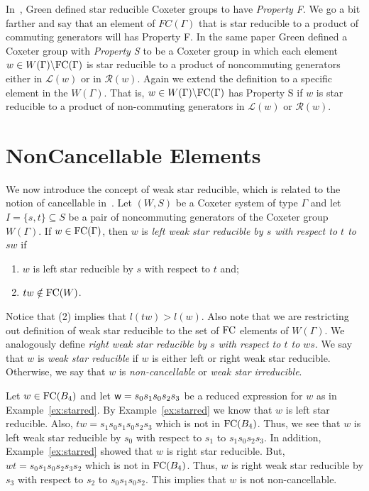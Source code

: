 In~\cite{Green2007}, Green defined star reducible Coxeter groups to have \emph{Property F}. We go a bit farther and say that an element of $FC(\Gamma)$ that is star reducible to a product of commuting generators will has Property F. In the same paper Green defined a Coxeter group with \emph{Property S} to be a Coxeter group in which each element $w \in W(\Gamma)\backslash \mathrm{FC}(\Gamma)$ is star reducible to a product of noncommuting generators either in $\mathcal{L}(w)$ or in $\mathcal{R}(w)$. Again we extend the definition to a specific element in the $W(\Gamma)$. That is, $w \in W(\Gamma)\backslash \mathrm{FC}(\Gamma)$ has Property S if $w$ is star reducible to a product of non-commuting generators in $\mathcal{L}(w)$ or $\mathcal{R}(w)$.

\section{NonCancellable Elements}
 
We now introduce the concept of weak star reducible, which is related to the notion of cancellable in~\cite{Fan1997}. Let $(W,S)$ be a Coxeter system of type $\Gamma$ and let $I=\{s,t\} \subseteq S$ be a pair of noncommuting generators of the Coxeter group $W(\Gamma)$. If $w  \in \mathrm{FC}(\Gamma)$, then $w$ is \emph{left weak star reducible by $s$ with respect to $t$ to $sw$} if
\begin{enumerate}
\item $w$ is left star reducible by $s$ with respect to $t$ and;
\item $tw \notin \mathrm{FC}(W)$.	
\end{enumerate}
Notice that (2) implies that $l(tw)>l(w)$. Also note that we are restricting out definition of weak star reducible to the set of $\mathrm{FC}$ elements of $W(\Gamma)$. We analogously define \emph{right weak star reducible by $s$ with respect to $t$ to $ws$}. We say that $w$ is \emph{weak star reducible} if $w$ is either left or right weak star reducible. Otherwise, we say that $w$ is \emph{non-cancellable} or \emph{weak star irreducible}.

\begin{example}\label{ex:noncancel}
Let $w \in \mathrm{FC}(B_4)$ and let $\mathsf{w}=s_0s_1s_0s_2s_3$ be a reduced expression for $w$ as in Example~\ref{ex:starred}. By Example~\ref{ex:starred} we know that $w$ is left star reducible. Also, $tw=s_1s_0s_1s_0s_2s_3$ which is not in $\mathrm{FC}(B_4)$. Thus, we see that $w$ is left weak star reducible by $s_0$ with respect to $s_1$ to $s_1s_0s_2s_3$. In addition, Example~\ref{ex:starred} showed that $w$ is right star reducible. But, $wt=s_0s_1s_0s_2s_3s_2$ which is not in $\mathrm{FC}(B_4)$. Thus, $w$ is right weak star reducible by $s_3$ with respect to $s_2$ to $s_0s_1s_0s_2$. This implies that $w$ is not non-cancellable.
\end{example}

